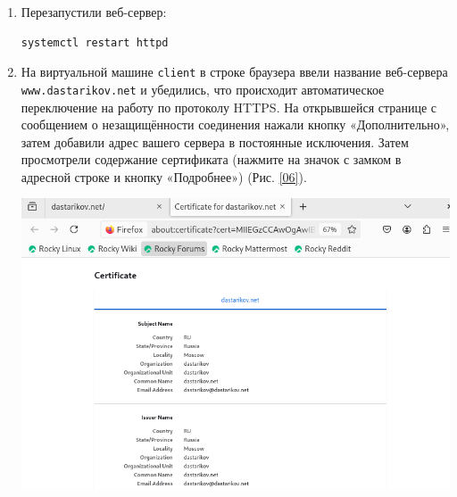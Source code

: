 \begin{enumerate}
\item Перезапустили веб-сервер:
\begin{verbatim}
systemctl restart httpd
\end{verbatim}
\item На виртуальной машине \texttt{client} в строке браузера ввели название веб-сервера \texttt{www.dastarikov.net} и убедились, что происходит автоматическое переключение на работу по протоколу HTTPS. На открывшейся странице с сообщением о незащищённости соединения нажали кнопку «Дополнительно», затем добавили адрес вашего сервера в постоянные исключения. Затем просмотрели содержание сертификата (нажмите на значок с замком в адресной строке и кнопку «Подробнее») (Рис. \ref{06}).

\begin{center}
    \centering
    \includegraphics[width=\textwidth]{../images/image06.png}
    \label{06}
\end{center}

\end{enumerate}
